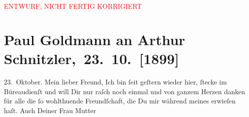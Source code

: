 
\begin{center}
            \textcolor{red}{ENTWURF, NICHT FERTIG KORRIGIERT}
                      \end{center}
            
         
         \newcommand{\erwaehntePersonen}{Personen: Fedor Mamroth, Louise Schnitzler, Jakob Wassermann}
         \newcommand{\erwaehnteInstitutionen}{Institutionen: Frankfurter Zeitung, Neue Freie Presse}
         \newcommand{\erwaehnteOrte}{Orte: Berlin, Frankfurt am Main, Wien}
         \newcommand{\erwaehnteWerke}{Werke: Agnes Jordan. Schauspiel in fünf Akten, Frankfurter Zeitung, Tagebuch, Wiener Burgtheater. (»Agnes Jordan« von Georg Hirschfeld.)}
               \section[ Paul Goldmann an Arthur Schnitzler, 23. 10. {[}1899{]}]{ Paul Goldmann an Arthur Schnitzler, 23. 10. {[}1899{]}}\nopagebreak{}\rehead{ }\begin{ledgroupsized}[t]{13cm}\normalsize\beginnumbering \toendnotes[C]{\smallbreak\pagebreak[2]} 
\toendnotes[C]{\smallbreak}\pstart
           \centering{}{\pb}23. Oktober.\pend
           \pstart{}Mein lieber Freund,\pend\pstart
           Ich bin ſeit geſtern wieder hier, ſtecke im Büreaudienſt und will Dir nur raſch noch
               einmal und von ganzem Herzen danken für alle die ſo wohlthuende Freundſchaft, die Du
               mir während meines \label{K_L02891-1v}\label{K_L02891-1h} erwieſen haſt.\pend
           \pstart
           Auch Deiner Frau Mutter

\end{ledgroupsized}
